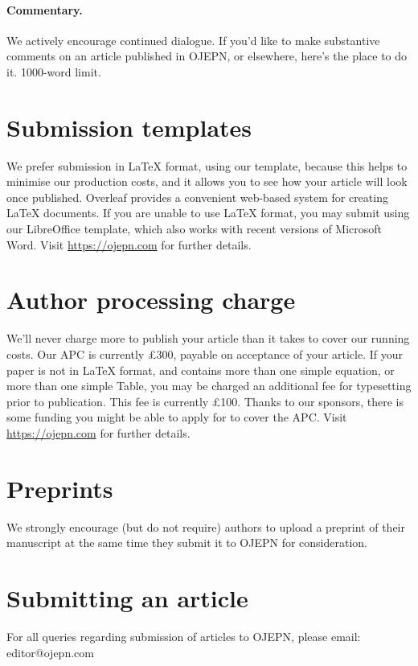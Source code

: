 \documentclass[twocolumn]{article}
\begin{document}
\paragraph{Commentary.} We actively encourage continued dialogue. If you'd like to make substantive comments on an article published in OJEPN, or elsewhere, here's the place to do it. 1000-word limit.


\section{Submission templates}

We prefer submission in LaTeX format, using our template, because this helps to minimise our production costs, and it allows you to see how your article will look once published. Overleaf provides a convenient web-based system for creating LaTeX documents. If you are unable to use LaTeX format, you may submit using our LibreOffice template, which also works with recent versions of Microsoft Word. Visit \url{https://ojepn.com} for further details.

\section{Author processing charge}

We'll never charge more to publish your article than it takes to cover our running costs. Our APC is currently £300, payable on acceptance of your article. If your paper is not in LaTeX format, and contains more than one simple equation, or more than one simple Table, you may be charged an additional fee for typesetting prior to publication. This fee is currently £100. Thanks to our sponsors, there is some funding you might be able to apply for to cover the APC. Visit \url{https://ojepn.com} for further details.

\section{Preprints}

We strongly encourage (but do not require) authors to upload a preprint of their manuscript at the same time they submit it to OJEPN for consideration. 

\section{Submitting an article}

For all queries regarding submission of articles to OJEPN, please email: editor@ojepn.com
\end{document}
